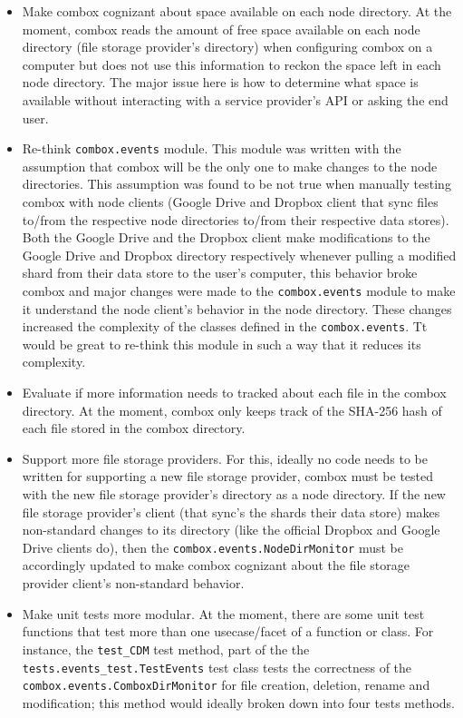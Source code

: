 \begin{itemize}
\item Make combox cognizant about space available on each node
  directory. At the moment, combox reads the amount of free space
  available on each node directory (file storage provider's directory)
  when configuring combox on a computer but does not use this
  information to reckon the space left in each node directory. The
  major issue here is how to determine what space is available without
  interacting with a service provider's API or asking the end user.


\item Re-think \verb+combox.events+ module. This module was written
  with the assumption that combox will be the only one to make changes
  to the node directories. This assumption was found to be not true
  when manually testing combox with node clients (Google Drive and
  Dropbox client that sync files to/from the respective node
  directories to/from their respective data stores). Both the Google
  Drive and the Dropbox client make modifications to the Google Drive
  and Dropbox directory respectively whenever pulling a modified shard
  from their data store to the user's computer, this behavior broke
  combox and major changes were made to the \verb+combox.events+
  module to make it understand the node client's behavior in the node
  directory. These changes increased the complexity of the classes
  defined in the \verb+combox.events+. Tt would be great to re-think
  this module in such a way that it reduces its complexity.

\item Evaluate if more information needs to tracked about each file in
  the combox directory. At the moment, combox only keeps track of the
  SHA-256 hash of each file stored in the combox directory.

\item Support more file storage providers. For this, ideally no code
  needs to be written for supporting a new file storage provider,
  combox must be tested with the new file storage provider's directory
  as a node directory. If the new file storage provider's client (that
  sync's the shards their data store) makes non-standard changes to
  its directory (like the official Dropbox and Google Drive clients
  do), then the \verb+combox.events.NodeDirMonitor+ must be
  accordingly updated to make combox cognizant about the file storage
  provider client's non-standard behavior.

\item Make unit tests more modular. At the moment, there are some unit
  test functions that test more than one usecase/facet of a function
  or class. For instance, the \verb+test_CDM+ test method, part of the
  the \verb+tests.events_test.TestEvents+ test class tests the
  correctness of the \verb+combox.events.ComboxDirMonitor+ for file
  creation, deletion, rename and modification; this method would
  ideally broken down into four tests methods.


\end{itemize}
